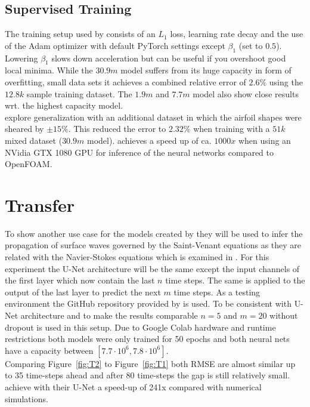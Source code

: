 \documentclass[acmtog]{techreportacmart}
\begin{document}
\subsection{Supervised Training}
The training setup used by \cite{Thuerey20} consists of an $L_1$ loss, learning rate decay and the 
use of the Adam optimizer \cite{kingma2014adam} with default PyTorch settings except $\beta_1$ 
(set to $0.5$). Lowering $\beta_1$ slows down acceleration but can be 
useful if you overshoot good local minima. 
While the $30.9m$ model suffers from its huge capacity in form of overfitting, 
small data sets it achieves a combined relative error of $2.6\%$ using the $12.8k$ sample training 
dataset. The $1.9m$ and $7.7m$ model also show close results wrt. the highest capacity model.\\
\cite{Thuerey20} explore generalization with an additional dataset in which the airfoil shapes 
were sheared by $\pm15\%$. This reduced the error to $2.32\%$ when training 
with a $51k$ mixed dataset ($30.9m$ model). 
\cite{Thuerey20} achieves a speed up of ca. $1000x$ when using an NVidia GTX 1080 
GPU for inference of the neural networks compared to OpenFOAM.

\section{Transfer}
To show another use case for the models created by \cite{Thuerey20} they will be used to infer 
the propagation of surface waves governed by the Saint-Venant equations as they are related with 
the Navier-Stokes equations which is examined in \cite{Fotiadis2020}. For this experiment the 
U-Net architecture will be the same except the input channels of the first layer which now contain 
the last $n$ time steps. The same is applied to the output of the last layer to predict the next 
$m$ time steps. As a testing environment the GitHub repository provided by \cite{Fotiadis2020} is 
used. To be consistent with \cite{Fotiadis2020} U-Net architecture and to make the results comparable 
$n=5$ and $m=20$ without dropout is used in this setup. Due to Google Colab hardware and runtime 
restrictions both models were only trained for 50 epochs and both neural nets have a capacity 
between $[7.7 \cdot 10^6, 7.8 \cdot 10^6]$.\\
Comparing Figure~\ref{fig:T2} to Figure~\ref{fig:T1} both RMSE are almost similar up to 35 
time-steps ahead and after 80 time-steps the gap is still relatively small. 
\cite{Fotiadis2020} achieve with their U-Net a speed-up of 241x compared with numerical 
simulations. 
\end{document}
